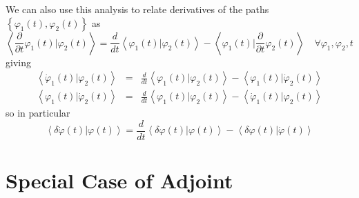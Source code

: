\documentclass[aps,preprint]{revtex4}
\begin{document}
We can also use this analysis to relate derivatives of the paths $\left\{
\varphi _{1}\left( t\right) ,\varphi _{2}\left( t\right) \right\} $ as 
\begin{equation}
\left\langle \frac{\partial }{\partial t}\varphi _{1}\left( t\right)
|\varphi _{2}\left( t\right) \right\rangle =\frac{d}{dt}\left\langle \varphi
_{1}\left( t\right) |\varphi _{2}\left( t\right) \right\rangle -\left\langle
\varphi _{1}\left( t\right) |\frac{\partial }{\partial t}\varphi _{2}\left(
t\right) \right\rangle \quad \forall \varphi _{1},\varphi _{2},t
\end{equation}%
giving 
\begin{eqnarray}
\left\langle \dot{\varphi}_{1}\left( t\right) |\varphi _{2}\left( t\right)
\right\rangle &=&\frac{d}{dt}\left\langle \varphi _{1}\left( t\right)
|\varphi _{2}\left( t\right) \right\rangle -\left\langle \varphi _{1}\left(
t\right) |\dot{\varphi}_{2}\left( t\right) \right\rangle \\
\left\langle \varphi _{1}\left( t\right) |\dot{\varphi}_{2}\left( t\right)
\right\rangle &=&\frac{d}{dt}\left\langle \varphi _{1}\left( t\right)
|\varphi _{2}\left( t\right) \right\rangle -\left\langle \dot{\varphi}%
_{1}\left( t\right) |\varphi _{2}\left( t\right) \right\rangle
\end{eqnarray}%
so in particular 
\begin{equation}
\left\langle \delta \dot{\varphi}\left( t\right) |\varphi \left( t\right)
\right\rangle =\frac{d}{dt}\left\langle \delta \varphi \left( t\right)
|\varphi \left( t\right) \right\rangle -\left\langle \delta \varphi \left(
t\right) |\dot{\varphi}\left( t\right) \right\rangle
\end{equation}

\section{Special Case of Adjoint\label{Appendix B}}
\end{document}
